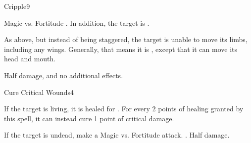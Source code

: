 \begin{spellsection}{Cripple}{9}
\begin{spellheader}
\end{spellheader}
\begin{spellcontent}
    \begin{spelltargetinginfo}
    \end{spelltargetinginfo}
    \begin{spelleffects}
        \begin{spellattack}{Magic vs. Fortitude}
            \spellsuccess {}. In addition, the target is \staggered.

            \spellcritical As above, but instead of being staggered, the target is unable to move its limbs, including any wings. Generally, that means it is \paralyzed, except that it can move its head and mouth.

            \spellfailure Half damage, and no additional effects.
        \end{spellattack}
        \spelldur \durshort
    \end{spelleffects}
\end{spellcontent}
\begin{spellfooter}
\end{spellfooter}
\end{spellsection}

\begin{spellsection}{Cure Critical Wounds}{4}
\begin{spellheader}
\end{spellheader}
\begin{spellcontent}
    \begin{spelltargetinginfo}
    \end{spelltargetinginfo}
    \begin{spelleffects}
        \spelleffect If the target is living, it is healed for . For every 2 points of healing granted by this spell, it can instead cure 1 point of critical damage.
        \begin{spellattacktriggered}{If the target is undead, make a Magic vs. Fortitude attack.}
            \spellsuccess {}.
            \spellfailure Half damage.
        \end{spellattacktriggered}
    \end{spelleffects}
\end{spellcontent}
\begin{spellfooter}
\end{spellfooter}
\end{spellsection}

